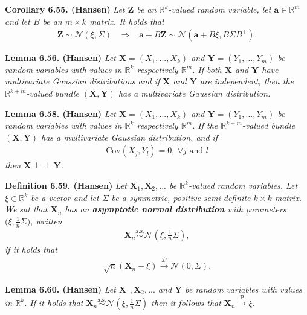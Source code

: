\documentclass[a4paper,12pt,openany]{book}
\begin{document}
\textbf{Corollary 6.55. (Hansen)} \emph{Let \(\mathbf{Z}\) be an \(\mathbb{R}^k\)-valued random variable, let \(\mathbf{a}\in\mathbb{R}^m\) and let \(B\) be an \(m\times k\) matrix. It holds that}
\begin{align*}
    \mathbf{Z}\sim \mathcal{N}(\xi,\Sigma)\hspace{10pt}\Rightarrow\hspace{10pt} \mathbf{a}+B\mathbf{Z}\sim \mathcal{N}\left(\mathbf{a}+B\xi,B\Sigma B^\top\right).
\end{align*}

\textbf{Lemma 6.56. (Hansen)} \emph{Let \(\mathbf{X}=(X_1,...,X_k)\) and \(\mathbf{Y}=(Y_1,...,Y_m)\) be random variables with values in \(\mathbb{R}^k\) respectively \(\mathbb{R}^m\). If both \(\mathbf{X}\) and \(\mathbf{Y}\) have multivariate Gaussian distributions and if \(\mathbf{X}\) and \(\mathbf{Y}\) are independent, then the \(\mathbb{R}^{k+m}\)-valued bundle \((\mathbf{X},\mathbf{Y})\) has a multivariate Gaussian distribution.}

\textbf{Lemma 6.58. (Hansen)} \emph{Let \(\mathbf{X}=(X_1,...,X_k)\) and \(\mathbf{Y}=(Y_1,...,Y_m)\) be random variables with values in \(\mathbb{R}^k\) respectively \(\mathbb{R}^m\). If the \(\mathbb{R}^{k+m}\)-valued bundle \((\mathbf{X},\mathbf{Y})\) has a multivariate Gaussian distribution, and if}
\begin{align*}
    \text{Cov}(X_j,Y_l)=0,\ \forall j\text{ and }l
\end{align*}
\emph{then \(\mathbf{X}\perp \!\!\! \perp\mathbf{Y}\).}

\textbf{Definition 6.59. (Hansen)} \emph{Let \(\mathbf{X}_1,\mathbf{X}_2,...\) be \(\mathbb{R}^k\)-valued random variables. Let \(\xi\in\mathbb{R}^k\) be a vector and let \(\Sigma\) be a symmetric, positive semi-definite \(k\times k\) matrix.}
\emph{We sat that \(\mathbf{X}_n\) has an \textbf{asymptotic normal distribution} with parameters \(\big(\xi,\frac{1}{n}\Sigma\big)\), written}
\begin{align*}
    \mathbf{X}_n\stackrel{\text{a.s.}}{\sim}\mathcal{N}\left(\xi,\frac{1}{n}\Sigma\right),
\end{align*}
\emph{if it holds that}
\begin{align*}
    \sqrt{n}(\mathbf{X}_n-\xi)\stackrel{\mathcal{D}}{\to} \mathcal{N}(0,\Sigma).
\end{align*}

\textbf{Lemma 6.60. (Hansen)} \emph{Let \(\mathbf{X}_1,\mathbf{X}_2,...\) and \(\mathbf{Y}\) be random variables with values in \(\mathbb{R}^k\). If it holds that \(\mathbf{X}_n\stackrel{\text{a.s.}}{\sim} \mathcal{N}(\xi,\frac{1}{n}\Sigma)\) then it follows that \(\mathbf{X}_n\stackrel{\text{P}}{\to}\xi\).}
\end{document}
